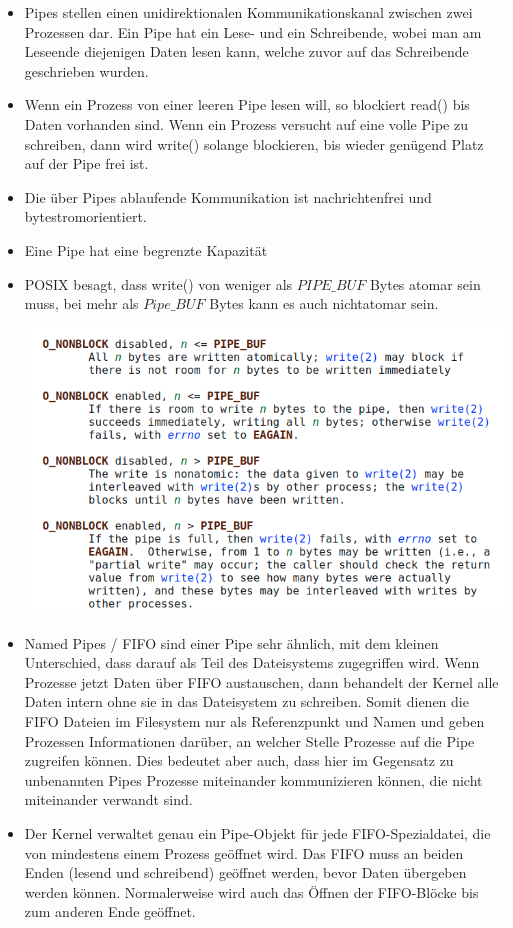 \documentclass[a4paper]{article}
\begin{document}
\begin{itemize}
    \item Pipes stellen einen unidirektionalen Kommunikationskanal zwischen zwei Prozessen dar. Ein Pipe hat ein Lese- und ein Schreibende, wobei man am Leseende diejenigen Daten lesen kann, welche zuvor auf das Schreibende geschrieben wurden.
    \item Wenn ein Prozess von einer leeren Pipe lesen will, so blockiert read() bis Daten vorhanden sind. Wenn ein Prozess versucht auf eine volle Pipe zu schreiben, dann wird write() solange blockieren, bis wieder genügend Platz auf der Pipe frei ist.
    \item Die über Pipes ablaufende Kommunikation ist nachrichtenfrei und bytestromorientiert.
    \item Eine Pipe hat eine begrenzte Kapazität
    \item POSIX besagt, dass write() von weniger als $PIPE\_BUF$ Bytes atomar sein muss, bei mehr als $Pipe\_BUF$ Bytes kann es auch nichtatomar sein.
          \begin{center}
              \includegraphics[width=0.5\linewidth]{Assets/Betriebssysteme_uebung/u5_a5.png}
          \end{center}
    \item Named Pipes / FIFO sind einer Pipe sehr ähnlich, mit dem kleinen Unterschied, dass darauf als Teil des Dateisystems zugegriffen wird. Wenn Prozesse jetzt Daten über FIFO austauschen, dann behandelt der Kernel alle Daten intern ohne sie in das Dateisystem zu schreiben. Somit dienen die FIFO Dateien im Filesystem nur als Referenzpunkt und Namen und geben Prozessen Informationen darüber, an welcher Stelle Prozesse auf die Pipe zugreifen können. Dies bedeutet aber auch, dass hier im Gegensatz zu unbenannten Pipes Prozesse miteinander kommunizieren können, die nicht miteinander verwandt sind.
    \item Der Kernel verwaltet genau ein Pipe-Objekt für jede FIFO-Spezialdatei, die von mindestens einem Prozess geöffnet wird.  Das FIFO muss an beiden Enden (lesend und schreibend) geöffnet werden, bevor Daten übergeben werden können.  Normalerweise wird auch das Öffnen der FIFO-Blöcke bis zum anderen Ende geöffnet.
\end{itemize}
\end{document}
